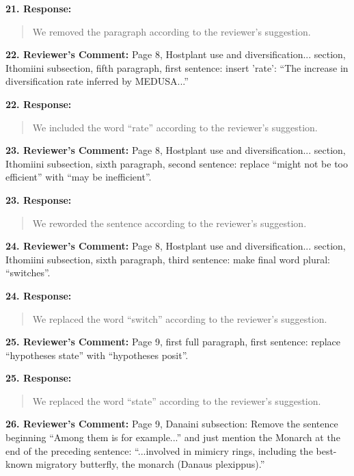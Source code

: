 \documentclass[]{article}
\begin{document}
\textbf{21. Response:}

\begin{quote}
\color{blue}
We removed the paragraph according to the reviewer's suggestion.
\end{quote}


\textbf{22. Reviewer's Comment:}
Page 8, Hostplant use and diversification... section, Ithomiini subsection,
fifth paragraph, first sentence: insert 'rate': “The increase in diversification
rate inferred by MEDUSA...”

\textbf{22. Response:}

\begin{quote}
\color{blue}
We included the word ``rate'' according to the reviewer's suggestion.
\end{quote}


\textbf{23. Reviewer's Comment:}
Page 8, Hostplant use and diversification... section, Ithomiini subsection,
sixth paragraph, second sentence: replace “might not be too efficient” with 
“may be inefficient”.

\textbf{23. Response:}

\begin{quote}
\color{blue}
We reworded the sentence according to the reviewer's suggestion.
\end{quote}


\textbf{24. Reviewer's Comment:}
Page 8, Hostplant use and diversification... section, Ithomiini subsection,
sixth paragraph, third sentence: make final word plural: “switches”.

\textbf{24. Response:}

\begin{quote}
\color{blue}
We replaced the word ``switch'' according to the reviewer's suggestion.
\end{quote}


\textbf{25. Reviewer's Comment:}
Page 9, first full paragraph, first sentence: replace “hypotheses state” with
“hypotheses posit”.

\textbf{25. Response:}

\begin{quote}
\color{blue}
We replaced the word ``state'' according to the reviewer's suggestion.
\end{quote}


\textbf{26. Reviewer's Comment:}
Page 9, Danaini subsection: Remove the sentence beginning “Among them is for
example...” and just mention the Monarch at the end of the preceding sentence:
“...involved in mimicry rings, including the best-known migratory butterfly,
the monarch (Danaus plexippus).”
\end{document}
